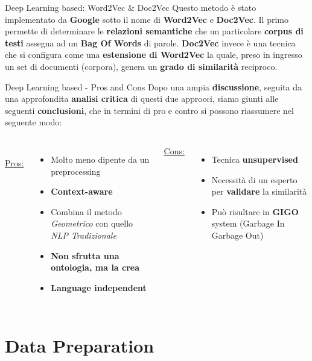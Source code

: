 \documentclass[british]{beamer}
\begin{document}
\begin{frame}{Deep Learning based: Word2Vec \& Doc2Vec}
	Questo metodo \`{e} stato implementato da \textbf{Google} sotto il nome di \textbf{Word2Vec} e \textbf{Doc2Vec}.
	Il primo permette di determinare le \textbf{relazioni semantiche} che un particolare \textbf{corpus di testi} assegna ad un \textbf{Bag Of Words} di parole.
	\textbf{Doc2Vec} invece \`{e} una tecnica che si configura come una \textbf{estensione di Word2Vec} la quale, preso in ingresso un set di documenti (corpora), genera un \textbf{grado di similarit\`{a}} reciproco.
\end{frame}

\begin{frame}{Deep Learning based - Pros and Cons}
	Dopo una ampia \textbf{discussione}, seguita da una approfondita \textbf{analisi critica} di questi due approcci, siamo giunti alle seguenti \textbf{conclusioni}, che in termini di pro e contro si possono riassumere nel seguente modo:
	\begin{columns}
		\\
		\underline{Pros:}
		\begin{itemize}
			\item Molto meno dipente da un preprocessing
			\item \textbf{Context-aware}
			\item Combina il metodo \textit{Geometrico} con quello \textit{NLP Tradizionale}
			\item \textbf{Non sfrutta una ontologia, ma la \alert{crea}} 
			\item \textbf{\alert{Language independent}}
		\end{itemize}
		\underline{Cons:}
		\begin{itemize}
			\item Tecnica \textbf{unsupervised}
			\item Necessit\`{a} di un esperto per \textbf{validare} la similarit\`{a}
			\item Pu\`{o} risultare in \textbf{GIGO} system (Garbage In Garbage Out)
		\end{itemize}
	\end{columns}
\end{frame}
	
\section{Data Preparation}
\end{document}
